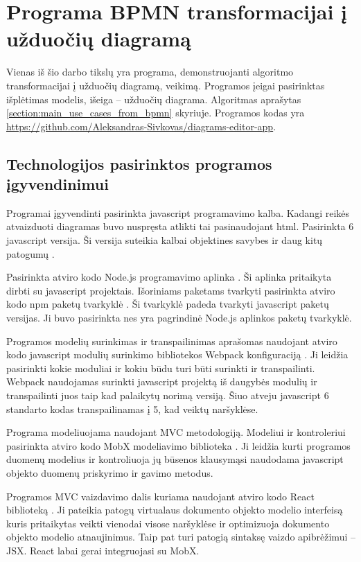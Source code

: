 \section{Programa BPMN transformacijai į užduočių diagramą}   


Vienas iš šio darbo tikslų yra programa, demonstruojanti algoritmo \BPMN{} transformacijai į užduočių diagramą, veikimą. Programos įeigai pasirinktas \BPMN{} išplėtimas \DVCM{} modelis, išeiga – užduočių diagrama. Algoritmas aprašytas \ref{section:main_use_cases_from_bpmn} skyriuje. Programos kodas yra \href{https://github.com/Aleksandras-Sivkovas/diagrams-editor-app}{https://github.com/Aleksandras-Sivkovas/diagrams-editor-app}.

\subsection{Technologijos pasirinktos programos įgyvendinimui}

Programai įgyvendinti pasirinkta javascript programavimo kalba. Kadangi reikės atvaizduoti diagramas buvo nuspręsta atlikti tai pasinaudojant html. Pasirinkta 6 javascript versija. Ši versija suteikia kalbai objektines savybes ir daug kitų patogumų \cite{EcmaScript}.

Pasirinkta atviro kodo Node.js programavimo aplinka \cite{nodeJs}. Ši aplinka pritaikyta dirbti su javascript projektais. Išoriniams paketams tvarkyti pasirinkta atviro kodo npm paketų tvarkyklė \cite{npmWebsite}. Ši tvarkyklė padeda tvarkyti javascript paketų versijas. Ji buvo pasirinkta nes yra pagrindinė Node.js aplinkos paketų tvarkyklė.

Programos modelių surinkimas ir transpailinimas aprašomas naudojant atviro kodo javascript modulių surinkimo bibliotekos Webpack konfiguraciją \cite{webpack}. Ji leidžia pasirinkti kokie moduliai ir kokiu būdu turi būti surinkti ir transpailinti. Webpack naudojamas surinkti javascript projektą iš daugybės modulių ir transpailinti juos taip kad palaikytų norimą versiją. Šiuo atveju javascript 6 standarto kodas transpailinamas į 5, kad veiktų naršyklėse.
 
Programa modeliuojama naudojant MVC metodologiją. Modeliui ir kontroleriui pasirinkta atviro kodo MobX modeliavimo biblioteka \cite{githubMobX}. Ji leidžia kurti programos duomenų modelius ir kontroliuoja jų būsenos klausymąsi naudodama javascript objekto duomenų priskyrimo ir gavimo metodus.

Programos MVC vaizdavimo dalis kuriama naudojant atviro kodo React biblioteką \cite{reactJs}. Ji pateikia patogų virtualaus dokumento objekto modelio interfeisą kuris pritaikytas veikti vienodai visose naršyklėse ir optimizuoja dokumento objekto modelio atnaujinimus. Taip pat turi patogią sintaksę vaizdo apibrėžimui – JSX. React labai gerai integruojasi su MobX.